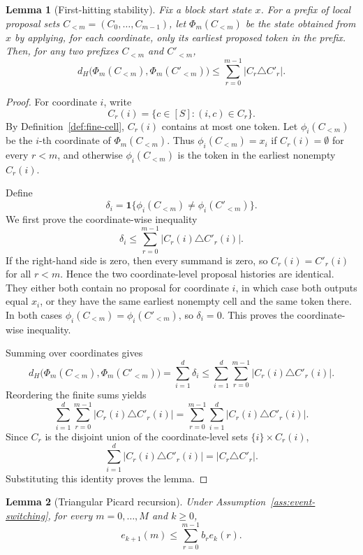 \documentclass{article}
\newtheorem{lemma}{Lemma}[section]
\begin{document}
\begin{lemma}[First-hitting stability]
\label{lem:first-hit-stability}
Fix a block start state $x$. For a prefix of local proposal sets $C_{<m}=(C_0,\ldots,C_{m-1})$, let $\Phi_m(C_{<m})$ be the state obtained from $x$ by applying, for each coordinate, only its earliest proposed token in the prefix. Then, for any two prefixes $C_{<m}$ and $C'_{<m}$,
\[
d_H\bigl(\Phi_m(C_{<m}),\Phi_m(C'_{<m})\bigr)
\le
\sum_{r=0}^{m-1}|C_r\triangle C'_r|.
\]
\end{lemma}

\begin{proof}
For coordinate $i$, write
\[
C_r(i)=\{c\in[S]:(i,c)\in C_r\}.
\]
By Definition~\ref{def:fine-cell}, $C_r(i)$ contains at most one token. Let $\phi_i(C_{<m})$ be the $i$-th coordinate of $\Phi_m(C_{<m})$. Thus $\phi_i(C_{<m})=x_i$ if $C_r(i)=\emptyset$ for every $r<m$, and otherwise $\phi_i(C_{<m})$ is the token in the earliest nonempty $C_r(i)$.

Define
\[
\delta_i=\mathbf 1\{\phi_i(C_{<m})\neq\phi_i(C'_{<m})\}.
\]
We first prove the coordinate-wise inequality
\[
\delta_i\le \sum_{r=0}^{m-1}|C_r(i)\triangle C'_r(i)|.
\]
If the right-hand side is zero, then every summand is zero, so $C_r(i)=C'_r(i)$ for all $r<m$. Hence the two coordinate-level proposal histories are identical. They either both contain no proposal for coordinate $i$, in which case both outputs equal $x_i$, or they have the same earliest nonempty cell and the same token there. In both cases $\phi_i(C_{<m})=\phi_i(C'_{<m})$, so $\delta_i=0$. This proves the coordinate-wise inequality.

Summing over coordinates gives
\[
d_H\bigl(\Phi_m(C_{<m}),\Phi_m(C'_{<m})\bigr)
=\sum_{i=1}^d\delta_i
\le
\sum_{i=1}^d\sum_{r=0}^{m-1}|C_r(i)\triangle C'_r(i)|.
\]
Reordering the finite sums yields
\[
\sum_{i=1}^d\sum_{r=0}^{m-1}|C_r(i)\triangle C'_r(i)|
=
\sum_{r=0}^{m-1}\sum_{i=1}^d|C_r(i)\triangle C'_r(i)|.
\]
Since $C_r$ is the disjoint union of the coordinate-level sets $\{i\}\times C_r(i)$,
\[
\sum_{i=1}^d|C_r(i)\triangle C'_r(i)|=|C_r\triangle C'_r|.
\]
Substituting this identity proves the lemma.
\end{proof}

\begin{lemma}[Triangular Picard recursion]
\label{lem:triangular-recursion}
Under Assumption~\ref{ass:event-switching}, for every $m=0,\ldots,M$ and $k\ge0$,
\[
e_{k+1}(m)
\le
\sum_{r=0}^{m-1}b_r e_k(r).
\]
\end{lemma}
\end{document}
